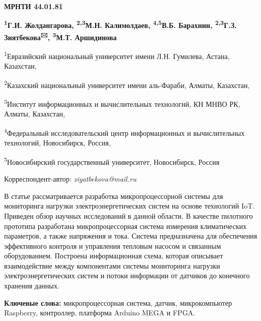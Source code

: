
\newpage
{\bfseries МРНТИ 44.01.81}


\begin{center}
{\bfseries \textsuperscript{1}Г.И. Жолдангарова, \textsuperscript{2,3}М.Н.
Калимолдаев, \textsuperscript{4,5}В.Б. Барахнин,
\textsuperscript{2,3}Г.З. Зиятбекова\textsuperscript{🖂}, \textsuperscript{3}М.Т. Аршидинова}

\textsuperscript{1}Евразийский национальный университет имени Л.Н.
Гумилева, Астана, Казахстан,

\textsuperscript{2}Казахский национальный университет имени аль-Фараби,
Алматы, Казахстан,

\textsuperscript{3}Институт информационных и вычислительных технологий,
КН МНВО РК, Алматы, Казахстан,

\textsuperscript{4}Федеральный исследовательский центр информационных и
вычислительных технологий, Новосибирск, Россия,

\textsuperscript{5}Новосибирский государственный университет,
Новосибирск, Россия
\end{center}
Корреспондент-автор: \emph{ziyatbekova@mail.ru}

 
В статье рассматривается разработка микропроцессорной системы для
мониторинга нагрузки электроэнергетических систем на основе технологий
IoT. Приведен обзор научных исследований в данной области. В качестве
пилотного прототипа разработана микропроцессорная система измерения
климатических параметров, а также напряжения и тока. Система
предназначена для обеспечения эффективного контроля и управления
тепловым насосом и связанным оборудованием. Построена информационная
схема, которая описывает взаимодействие между компонентами системы
мониторинга нагрузки электроэнергетических систем и потоки информации от
датчиков до конечного хранения данных.

{\bfseries Ключевые слова:} микропроцессорная система, датчик,
микрокомпьютер Raspberry, контроллер, платформа Arduino MEGA и FPGA.



